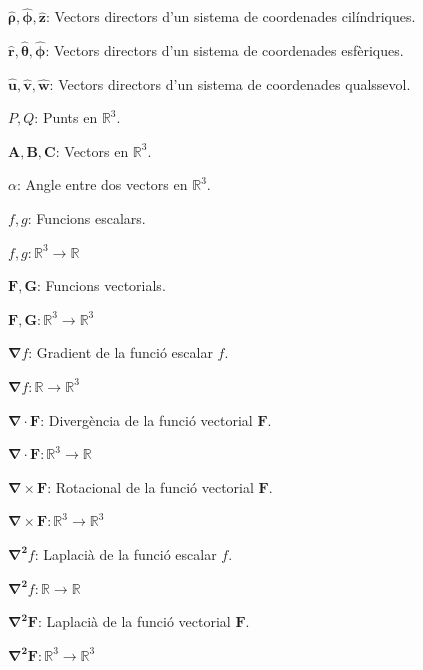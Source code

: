 \documentclass[catalan,a4paper,twoside,11pt]{article}
\begin{document}
\begin{list}{}
   \item[$\boldsymbol{\hat{\rho}},\boldsymbol{\hat{\phi}},\boldsymbol{\hat{z}}$:] Vectors directors d'un sistema de   coordenades cilíndriques.

   \item[$\boldsymbol{\hat{r}},\boldsymbol{\hat{\theta}},\boldsymbol{\hat{\phi}}$:] Vectors directors d'un sistema de   coordenades esfèriques.

   \item[$\boldsymbol{\hat{u}},\boldsymbol{\hat{v}},\boldsymbol{\hat{w}}$:]
   Vectors directors d'un sistema de  coordenades   qualssevol.

   \item[$P, Q$:] Punts en $\mathbb{R}^3$.

   \item[$\boldsymbol{A,B,C}$:] Vectors en $\mathbb{R}^3$.

   \item[$\alpha$:] Angle entre dos vectors en $\mathbb{R}^3$.

   \item[$f,g$:] Funcions escalars.

   $f,g \colon \mathbb{R}^3\rightarrow\mathbb{R}$

   \item[$\boldsymbol{F,G}$:] Funcions vectorials.

   $\boldsymbol{F,G}\colon\mathbb{R}^3\rightarrow\mathbb{R}^3$

   \item[$\boldsymbol{\nabla}f$:] Gradient de la funció escalar $f$.

   $\boldsymbol{\nabla}f\colon\mathbb{R}\rightarrow\mathbb{R}^3$

   \item[$\boldsymbol{\nabla\cdot F}$:] Divergència de la funció vectorial $\boldsymbol{F}$.

   $\boldsymbol{\nabla\cdot F}\colon \mathbb{R}^3\rightarrow\mathbb{R}$

   \item[$\boldsymbol{\nabla\times F}$:] Rotacional de la funció vectorial $\boldsymbol{F}$.

   $\boldsymbol{\nabla\times F}\colon   \mathbb{R}^3\rightarrow\mathbb{R}^3$

   \item[$\boldsymbol{\nabla^2}f$:] Laplacià de la funció escalar $f$.

   $\boldsymbol{\nabla^2}f\colon \mathbb{R}\rightarrow\mathbb{R}$

   \item[$\boldsymbol{\nabla^2F}$:] Laplacià de la funció vectorial $\boldsymbol{F}$.

    $\boldsymbol{\nabla^2F}\colon \mathbb{R}^3\rightarrow\mathbb{R}^3$
\end{list}
\end{document}
